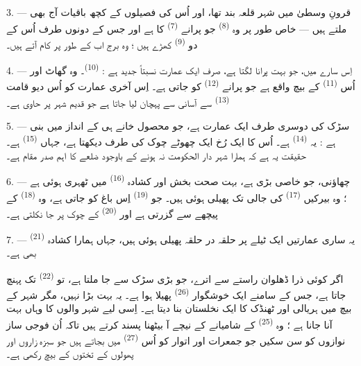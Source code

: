 3. --- قرونِ وسطیٰ میں شہر قلعہ بند تھا، اور اُس کی فصیلوں کے کچھ
باقیات آج بھی ملتے ہیں — خاص طور پر وہ 
\textsuperscript{(8)} جو پرانے  \textsuperscript{(7)}
کا ہے اور جس کے دونوں طرف اُس کے دو 
\textsuperscript{(9)} کھڑے ہیں ؛ وہ برج اب  کے طور پر
کام آتے ہیں۔

4. --- اِس سارے  میں، جو بہت پرانا لگتا ہے، صرف ایک
عمارت نسبتاً جدید ہے :  \textsuperscript{(10)}۔ وہ
گھاٹ اور اُس  \textsuperscript{(11)} کے بیچ واقع ہے جو
پرانے  \textsuperscript{(12)} کو جاتی ہے۔ اِس
آخری عمارت کو اُس دیو قامت  \textsuperscript{(13)}
سے آسانی سے پہچان لیا جاتا ہے جو قدیم شہر پر حاوی ہے۔

5. --- سڑک کی دوسری طرف ایک عمارت  ہے، جو محصول خانے ہی
کے انداز میں بنی ہے : یہ  \textsuperscript{(14)}
ہے۔ اُس کا ایک رُخ ایک چھوٹے چوک کی طرف دیکھتا ہے، جہاں
 \textsuperscript{(15)} ہے۔ حقیقت یہ ہے کہ
ہمارا شہر دار الحکومت نہ ہونے کے باوجود ضلعے کا اہم صدر مقام ہے۔

\VUsaut{5.0mm}
\VUsaut{3.4mm}

6. --- چھاؤنی، جو خاصی بڑی ہے، بہت صحت بخش اور کشادہ
 \textsuperscript{(16)} میں ٹھہری ہوئی ہے ؛ وہ بیرکیں
 \textsuperscript{(17)} کی جالی تک پھیلی ہوئی ہیں۔
جو  \textsuperscript{(19)} اِس باغ کو جاتی ہے، وہ
 \textsuperscript{(18)} کے پیچھے سے گزرتی ہے اور
 \textsuperscript{(20)} کے چوک پر جا نکلتی ہے۔

7. --- یہ ساری عمارتیں ایک ٹیلے پر حلقہ در حلقہ پھیلی ہوئی ہیں، جہاں
ہمارا کشادہ  \textsuperscript{(21)} بھی ہے۔

اگر کوئی ذرا ڈھلوان راستے سے اترے، جو بڑی سڑک سے جا ملتا ہے، تو
 \textsuperscript{(22)} تک پہنچ جاتا ہے، جس کے سامنے ایک
خوشگوار  \textsuperscript{(26)} پھیلا ہوا ہے۔ یہ
 بہت بڑا نہیں، مگر شہر کے بیچ میں ہریالی اور ٹھنڈک کا
ایک نخلستان بنا دیتا ہے۔ اِسی لیے شہر والوں کا وہاں بہت آنا جانا ہے ؛
وہ  \textsuperscript{(25)} کے شامیانے کے نیچے آ
بیٹھنا پسند کرتے ہیں تاکہ اُن فوجی ساز نوازوں کو سن سکیں جو جمعرات
اور اتوار کو اُس  \textsuperscript{(27)} میں بجاتے ہیں جو
سبزہ زاروں اور پھولوں کے تختوں کے بیچ رکھی ہے۔

